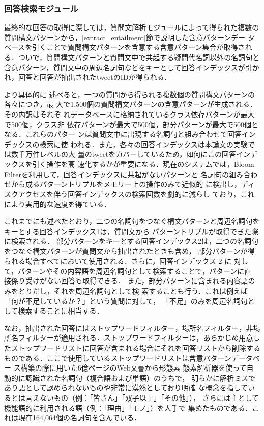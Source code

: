 \documentclass[japanese]{jnlp_1.4}
\begin{document}
\subsubsection{回答検索モジュール}

最終的な回答の取得に際しては，質問文解析モジュールによって得られた複数の
質問構文パターンから，\ref{extract_entailment}節で説明した含意パターンデー
タベースを引くことで質問構文パターンを含意する含意パターン集合が取得され
る．ついで，質問構文パターンと質問文中で共起する疑問代名詞以外の名詞句と
含意パターン，質問文中の周辺名詞句などをキーとして回答インデックスが引か
れ，回答と回答が抽出されたtweetのIDが得られる．

より具体的に
述べると，一つの質問から得られる複数個の質問構文パターンの各々につき，最
大で1,500個の質問構文パターンの含意パターンが生成される．その内訳はそれぞ
れデータベースに格納されているクラス依存パターンが最大で500個，クラス非
依存パターンが最大で500個，部分パターンが最大で500個となる．これらのパター
ンは質問文中に出現する名詞句と組み合わせて回答インデックスの検索に使
われる．また，各々の回答インデックスは本論文の実験では数千万件レベルの大
量のtweetをカバーしているため，如何にこの回答インデックスを引く操作を高
速化するかが重要になる．現在のシステムでは，Bloom
Filter\cite{Bloom1970}を利用して，回答インデックスに共起がないパターンと
名詞句の組み合わせから成るパターントリプルをメモリー上の操作のみで近似的
に検出し，ディスクアクセスを伴う回答インデックスの検索回数を劇的に減らし
ており，これにより実用的な速度を得ている．

これまでにも述べたとおり，二つの名詞句をつなぐ構文パターンと周辺名詞句をキーとする回答インデックス1は，質問文から
パターントリプルが取得できた際に検索される．
部分パターンをキーとする回答インデックス2は，二つの名詞句をつなぐ構文パターンが質問文から抽出されたときも含め，
部分パターンが得られる場合すべてにおいて使用される．さらに，回答インデックス 2 に
対して，パターンやその内容語を周辺名詞句として検索することで，パターンに直
接係り受けがない回答も取得できる．
また，部分パターンに含まれる内容語のみをとりだし，それを周辺名詞句として検
索することも行う．これは例えば「何が不足しているか？」という質問に対して，
「不足」のみを周辺名詞句として検索することに相当する．


なお，抽出された回答にはストップワードフィルター，場所名フィルター，非場
所名フィルターが適用される．ストップワードフィルターは，あらかじめ用意し
たストップワードリストに回答が含まれる場合にそれを回答リストから削除する
ものである．ここで使用しているストップワードリストは含意パターンデータベー
ス構築の際に用いた6億ページのWeb文書から形態素
態素解析器を使って自動的に認識された名詞句（複合語および単語）のうちで，
明らかに解析ミスであり語として認められないものや非常に漠然としており明確
な概念を指しているとは言えないもの（例：「皆さん」「双子以上」「その他」），
さらには主として機能語的に利用される語（例：「理由」「モノ」）を人手で
集めたものである．これは現在164,064個の名詞句を含んでいる．
\end{document}
